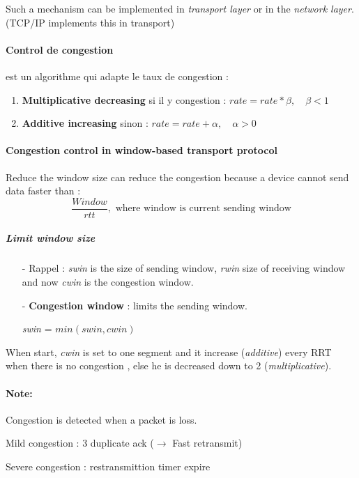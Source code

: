 Such a mechanism can be implemented in \textit{transport layer} or in the \textit{network
layer}. (TCP/IP implements this in transport)

\paragraph{Control de congestion} est un algorithme qui adapte le taux de congestion :
\begin{enumerate}
    \item \textbf{Multiplicative decreasing} si il y congestion : $rate = rate*\beta, \quad \beta <1$
    \item \textbf{Additive increasing} sinon :  $rate =  rate + \alpha, \quad \alpha>0$
\end{enumerate}

\paragraph{Congestion control in window-based transport protocol}
Reduce the window size can reduce the congestion because a device cannot
send data faster than : $$\frac{Window}{rtt}, \textrm{ where window is current sending window} $$

\subparagraph{Limit window size}
\begin{itemize}
    \item[-] Rappel : \textit{swin} is the size of sending window, \textit{rwin} size
        of receiving window and now \textit{cwin} is the congestion window.
    \item[-] \textbf{Congestion window} : limits the sending window. 

        \textit{swin} = $min( swin, cwin )$
\end{itemize}

When start, \textit{cwin} is set to one segment and it increase (\textit{additive}) every RRT when there is
no congestion , else he is decreased down to 2 (\textit{multiplicative}).

\paragraph{Note: }
\begin{description}
    \item Congestion is detected when a packet is loss.
    \item Mild congestion : 3 duplicate ack ($\to$ Fast retransmit)
    \item Severe congestion : restransmittion timer expire
        \end{description}

